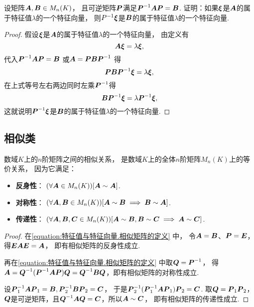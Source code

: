 \begin{example}
设矩阵\(\boldsymbol{A},\boldsymbol{B} \in M_n(K)\)，
且可逆矩阵\(\boldsymbol{P}\)满足\(\boldsymbol{P}^{-1} \boldsymbol{A} \boldsymbol{P} = \boldsymbol{B}\).
证明：如果\(\boldsymbol\xi\)是\(\boldsymbol{A}\)的属于特征值\(\lambda\)的一个特征向量，
则\(P^{-1} \boldsymbol\xi\)是\(\boldsymbol{B}\)的属于特征值\(\lambda\)的一个特征向量.
\begin{proof}
假设\(\boldsymbol\xi\)是\(\boldsymbol{A}\)的属于特征值\(\lambda\)的一个特征向量，
由定义有\begin{equation*}
	\boldsymbol{A} \boldsymbol\xi = \lambda \boldsymbol\xi,
\end{equation*}
代入\(\boldsymbol{P}^{-1} \boldsymbol{A} \boldsymbol{P} = \boldsymbol{B}\)
或\(\boldsymbol{A} = \boldsymbol{P} \boldsymbol{B} \boldsymbol{P}^{-1}\)
得\begin{equation*}
	\boldsymbol{P} \boldsymbol{B} \boldsymbol{P}^{-1} \boldsymbol\xi
	= \lambda \boldsymbol\xi,
\end{equation*}
在上式等号左右两边同时左乘\(\boldsymbol{P}^{-1}\)得\begin{equation*}
	\boldsymbol{B} \boldsymbol{P}^{-1} \boldsymbol\xi
	= \lambda \boldsymbol{P}^{-1} \boldsymbol\xi,
\end{equation*}
这就说明\(\boldsymbol{P}^{-1} \boldsymbol\xi\)是\(\boldsymbol{B}\)的属于特征值\(\lambda\)的一个特征向量.
\end{proof}
\end{example}

\subsection{相似类}
\begin{property}\label{theorem:特征值与特征向量.相似关系是等价关系}
数域\(K\)上的\(n\)阶矩阵之间的相似关系，
是数域\(K\)上的全体\(n\)阶矩阵\(M_n(K)\)上的等价关系，
因为它满足：\begin{itemize}
	\item {\rm\bf 反身性}：
	\((\forall \boldsymbol{A} \in M_n(K))
	[\boldsymbol{A}\sim\boldsymbol{A}]\).

	\item {\rm\bf 对称性}：
	\((\forall \boldsymbol{A},\boldsymbol{B} \in M_n(K))
	[\boldsymbol{A} \sim \boldsymbol{B} \implies \boldsymbol{B} \sim \boldsymbol{A}]\).

	\item {\rm\bf 传递性}：
	\((\forall \boldsymbol{A},\boldsymbol{B},\boldsymbol{C} \in M_n(K))
	[\boldsymbol{A} \sim \boldsymbol{B}, \boldsymbol{B} \sim \boldsymbol{C} \implies \boldsymbol{A} \sim \boldsymbol{C}]\).
\end{itemize}
\begin{proof}
在\cref{equation:特征值与特征向量.相似矩阵的定义} 中，
令\(\boldsymbol{A}=\boldsymbol{B}\)、\(\boldsymbol{P}=\boldsymbol{E}\)，得\(\boldsymbol{E}\boldsymbol{A}\boldsymbol{E}=\boldsymbol{A}\)，
即有相似矩阵的反身性成立.

再在\cref{equation:特征值与特征向量.相似矩阵的定义} 中取\(\boldsymbol{Q}=\boldsymbol{P}^{-1}\)，
得\(\boldsymbol{A} = \boldsymbol{Q}^{-1}(\boldsymbol{P}^{-1}\boldsymbol{A}\boldsymbol{P})\boldsymbol{Q} = \boldsymbol{Q}^{-1}\boldsymbol{B}\boldsymbol{Q}\)，即有相似矩阵的对称性成立.

设\(\boldsymbol{P}_1^{-1}\boldsymbol{A}\boldsymbol{P}_1=\boldsymbol{B},
\boldsymbol{P}_2^{-1}\boldsymbol{B}\boldsymbol{P}_2=\boldsymbol{C}\)，
于是\(\boldsymbol{P}_2^{-1}(\boldsymbol{P}_1^{-1}\boldsymbol{A}\boldsymbol{P}_1)\boldsymbol{P}_2=\boldsymbol{C}\).
取\(\boldsymbol{Q}=\boldsymbol{P}_1\boldsymbol{P}_2\)，\(\boldsymbol{Q}\)是可逆矩阵，且\(\boldsymbol{Q}^{-1}\boldsymbol{A}\boldsymbol{Q}=\boldsymbol{C}\)，所以\(\boldsymbol{A}\sim\boldsymbol{C}\)，
即有相似矩阵的传递性成立.
\end{proof}
\end{property}

